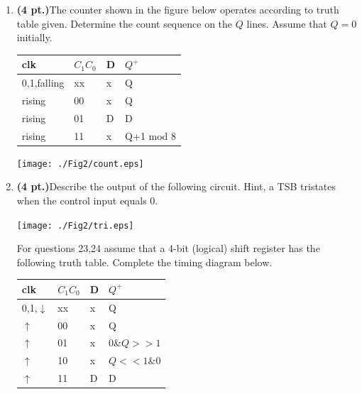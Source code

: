 \documentclass{article}
\begin{document}
\begin{enumerate}
\pagebreak{}
\item {\bf (4 pt.)}The counter shown in the figure below operates according to
truth table given.  Determine the count sequence on the
$Q$ lines.  Assume that $Q=0$ initially.

\begin{tabular}{l|l|l||l}
clk & $C_1 C_0$ & D & $Q^+$ \\ \hline
0,1,falling & xx & x & Q \\ \hline
rising & 00 & x & Q \\  \hline
rising & 01 & D & D \\  \hline
rising & 11 & x & Q+1 mod 8 \\ 
\end{tabular}

\texttt{[image: ./Fig2/count.eps]}

\item {\bf (4 pt.)}Describe the output of the following circuit.
Hint, a TSB tristates when the control input equals 0.

\texttt{[image: ./Fig2/tri.eps]}

\pagebreak


For questions 23,24 assume that a 4-bit (logical) shift register 
has the following truth table.   Complete the timing diagram below.

\begin{tabular}{l|l|l||l}
clk             & $C_1 C_0$     & D & $Q^+$     \\ \hline
0,1,$\downarrow$& xx            & x & Q         \\ \hline
$\uparrow$      & 00            & x & Q         \\  \hline
$\uparrow$      & 01            & x & 0\&$Q>>1$ \\  \hline
$\uparrow$      & 10            & x & $Q<<1$\&0 \\  \hline
$\uparrow$      & 11            & D & D         \\
\end{tabular}


\end{enumerate}
\end{document}
